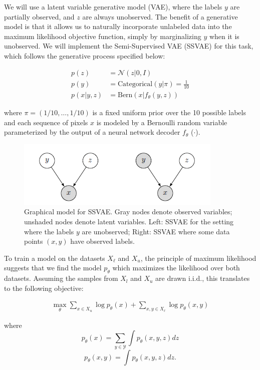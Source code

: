 \documentclass{article}
\theoremstyle{case}
\theoremstyle{definition}
\begin{document}
We will use a latent variable generative model (VAE), where the labels $y$ are partially observed, and $z$ are always unobserved. The benefit of a generative model is that it allows us to naturally incorporate unlabeled data into the maximum likelihood objective function, simply by marginalizing $y$ when it is unobserved. We will implement the Semi-Supervised VAE (SSVAE) for this task, which follows the generative process specified below:

\begin{align*}
p(z) &= \mathcal{N}(z|0,I) \\
p(y) &= \text{Categorical}(y|\pi)=\frac{1}{10} \\
p(x|y,z) &= \text{Bern}(x|f_\theta(y,z))
\end{align*}

where $\pi = (1/10, \dots ,1/10)$ is a fixed uniform prior over the 10 possible labels and each sequence of pixels $x$ is modeled by a Bernoulli random variable parameterized by the output of a neural network decoder $f_\theta$ ($\cdot$).

\begin{figure}[h]
    \centering
    \includegraphics[width=0.5\linewidth]{fig.PNG}
    \caption{Graphical model for SSVAE. Gray nodes denote observed variables; unshaded nodes denote latent variables. Left: SSVAE for the setting where the labels $y$ are unobserved; Right: SSVAE where some data points $(x,y)$ have observed labels.}
    \label{fig:enter-label}
\end{figure}

To train a model on the datasets $X_\ell$ and $X_u$, the principle of maximum likelihood suggests that we find the model $p_\theta$ which maximizes the likelihood over both datasets. Assuming the samples from $X_l$ and $X_u$ are drawn i.i.d., this translates to the following objective:

\begin{align*}
\max_\theta \sum_{x \in X_u} \log p_\theta(x) + \sum_{x,y \in X_\ell} \log p_\theta(x,y)
\end{align*}

where 
\[ p_\theta(x) = \sum_{y \in \mathcal{Y}} \int p_\theta(x, y, z) dz \]
\[ p_\theta(x, y) = \int p_\theta(x, y, z) dz. \]
\end{document}
